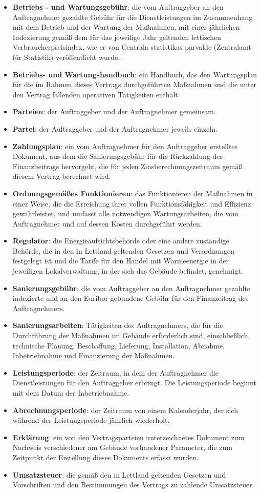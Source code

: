 \begin{multicols}{2}
\begin{itemize}[label={}]
  \item\textbf{Betriebs - und Wartungsgebühr}: die vom Auftraggeber an den Auftragnehmer gezahlte Gebühr für die Dienstleistungen im Zusammenhang mit dem Betrieb und der Wartung der Maßnahmen, mit einer jährlichen Indexierung gemäß dem für das jeweilige Jahr geltenden lettischen Verbraucherpreisindex, wie er von Centrala statistikas parvalde (Zentralamt für Statistik) veröffentlicht wurde.
  \item\textbf{Betriebs- und Wartungshandbuch}: ein Handbuch, das den Wartungsplan für die im Rahmen dieses Vertrags durchgeführten Maßnahmen und die unter den Vertrag fallenden operativen Tätigkeiten enthält.
  \item\textbf{Parteien}: der Auftraggeber und der Auftragnehmer gemeinsam.
  \item\textbf{Partei}: der Auftraggeber und der Auftragnehmer jeweils einzeln.
  \item\textbf{Zahlungsplan}: ein vom Auftragnehmer für den Auftraggeber erstelltes Dokument, aus dem die Sanierungsgebühr für die Rückzahlung des Finanzbeitrags hervorgeht, die für jeden Zinsberechnungszeitraum gemäß diesem Vertrag berechnet wird.
  \item\textbf{Ordnungsgemäßes Funktionieren}: das Funktionieren der Maßnahmen in einer Weise, die die Erreichung ihrer vollen Funktionsfähigkeit und Effizienz gewährleistet, und umfasst alle notwendigen Wartungsarbeiten, die vom Auftragnehmer und auf dessen Kosten durchgeführt werden.
  \item\textbf{Regulator}: die Energieaufsichtsbehörde oder eine andere zuständige Behörde, die in den in Lettland geltenden Gesetzen und Verordnungen festgelegt ist und die Tarife für den Handel mit Wärmeenergie in der jeweiligen Lokalverwaltung, in der sich das Gebäude befindet, genehmigt.
  \item\textbf{Sanierungsgebühr}: die vom Auftraggeber an den Auftragnehmer gezahlte indexierte und an den Euribor gebundene Gebühr für den Finanzeitrag des Auftragnehmers.
  \item\textbf{Sanierungsarbeiten}: Tätigkeiten des Auftragnehmers, die für die Durchführung der Maßnahmen im Gebäude erforderlich sind, einschließlich technische Planung, Beschaffung, Lieferung, Installation, Abnahme, Inbetriebnahme und Finanzierung der Maßnahmen.
  \item\textbf{Leistungsperiode}: der Zeitraum, in dem der Auftragnehmer die Dienstleistungen für den Auftraggeber erbringt. Die Leistungsperiode beginnt mit dem Datum der Inbetriebnahme.
  \item\textbf{Abrechnungsperiode}: der Zeitraum von einem Kalenderjahr, der sich während der Leistungsperiode jährlich wiederholt.
  \item\textbf{Erklärung}: ein von den Vertragsparteien unterzeichnetes Dokument zum Nachweis verschiedener am Gebäude vorhandener Parameter, die zum Zeitpunkt der Erstellung dieses Dokuments erfasst wurden.
  \item\textbf{Umsatzsteuer}: die gemäß den in Lettland geltenden Gesetzen und Vorschriften und den Bestimmungen des Vertrags zu zahlende Umsatzsteuer.
  \end{itemize}


\end{multicols}
